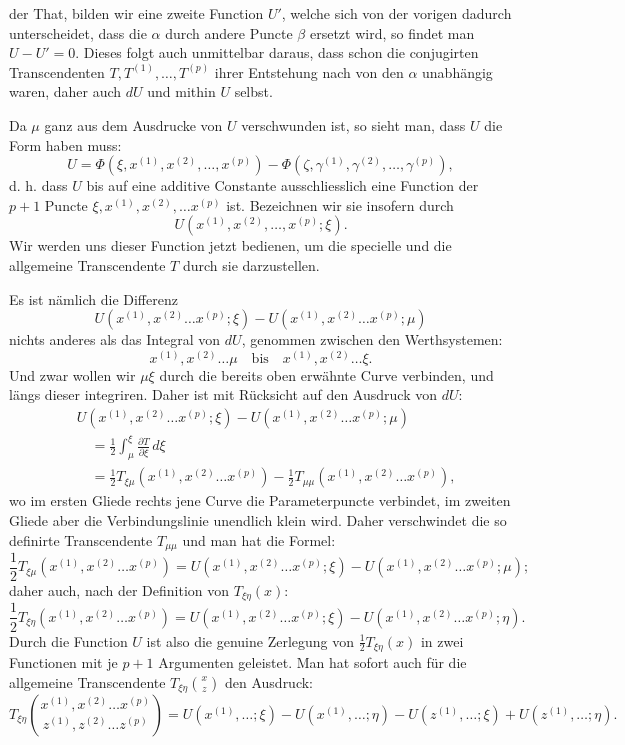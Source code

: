 \documentclass[10pt]{article}
\begin{document}
der That, bilden wir eine zweite Function \(U'\), welche sich von der vorigen dadurch unterscheidet, dass die \(\alpha\) durch andere Puncte \(\beta\) ersetzt wird, so findet man \(U-U'=0\). Dieses folgt auch unmittelbar daraus, dass schon die conjugirten Transcendenten \(T,T^{(1)},\ldots,T^{(p)}\) ihrer Entstehung nach von den \(\alpha\) unabhängig waren, daher auch \(dU\) und mithin \(U\) selbst.

Da \(\mu\) ganz aus dem Ausdrucke von \(U\) verschwunden ist, so sieht man, dass \(U\) die Form haben muss:
\[
U=\Phi(\xi,x^{(1)},x^{(2)},\ldots,x^{(p)})-\Phi(\zeta,\gamma^{(1)},\gamma^{(2)},\ldots,\gamma^{(p)}),
\]
d. h. dass \(U\) bis auf eine additive Constante ausschliesslich eine Function der \(p+1\) Puncte \(\xi,x^{(1)},x^{(2)},\ldots x^{(p)}\) ist. Bezeichnen wir sie insofern durch
\[
U(x^{(1)},x^{(2)},\ldots,x^{(p)};\xi).
\]
Wir werden uns dieser Function jetzt bedienen, um die specielle und die allgemeine Transcendente \(T\) durch sie darzustellen.

Es ist nämlich die Differenz
\[
U(x^{(1)},x^{(2)}\ldots x^{(p)};\xi)-U(x^{(1)},x^{(2)}\ldots x^{(p)};\mu)
\]
nichts anderes als das Integral von \(dU\), genommen zwischen den Werthsystemen:
\[
x^{(1)},x^{(2)}\ldots\mu\quad \text{bis}\quad x^{(1)},x^{(2)}\ldots\xi.
\]
Und zwar wollen wir \(\mu\xi\) durch die bereits oben erwähnte Curve verbinden, und längs dieser integriren. Daher ist mit Rücksicht auf den Ausdruck von \(dU\):
\[
\begin{aligned}
&U(x^{(1)},x^{(2)}\ldots x^{(p)};\xi)-U(x^{(1)},x^{(2)}\ldots x^{(p)};\mu)\\
&\quad=\frac12\int_{\mu}^{\xi}\frac{\partial T}{\partial\xi}\,d\xi\\
&\quad=\frac12T_{\xi\mu}(x^{(1)},x^{(2)}\ldots x^{(p)})
-\frac12T_{\mu\mu}(x^{(1)},x^{(2)}\ldots x^{(p)}),
\end{aligned}
\]
wo im ersten Gliede rechts jene Curve die Parameterpuncte verbindet, im zweiten Gliede aber die Verbindungslinie unendlich klein wird. Daher verschwindet die so definirte Transcendente \(T_{\mu\mu}\) und man hat die Formel:
\[
\frac12T_{\xi\mu}(x^{(1)},x^{(2)}\ldots x^{(p)})=U(x^{(1)},x^{(2)}\ldots x^{(p)};\xi)-U(x^{(1)},x^{(2)}\ldots x^{(p)};\mu);
\]
daher auch, nach der Definition von \(T_{\xi\eta}(x)\):
\[
\frac12T_{\xi\eta}(x^{(1)},x^{(2)}\ldots x^{(p)})=U(x^{(1)},x^{(2)}\ldots x^{(p)};\xi)-U(x^{(1)},x^{(2)}\ldots x^{(p)};\eta).
\]
Durch die Function \(U\) ist also die genuine Zerlegung von \(\frac12T_{\xi\eta}(x)\) in zwei Functionen mit je \(p+1\) Argumenten geleistet. Man hat sofort auch für die allgemeine Transcendente \(T_{\xi\eta}\binom{x}{z}\) den Ausdruck:
\[
T_{\xi\eta}\binom{x^{(1)},x^{(2)}\ldots x^{(p)}}{z^{(1)},z^{(2)}\ldots z^{(p)}}
=U(x^{(1)},\ldots;\xi)-U(x^{(1)},\ldots;\eta)-U(z^{(1)},\ldots;\xi)+U(z^{(1)},\ldots;\eta).
\]
\end{document}
